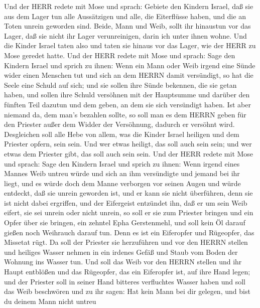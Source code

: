  Und der HERR redete mit Mose und sprach: 
Gebiete den Kindern Israel, daß sie aus dem Lager tun alle Aussätzigen
und alle, die Eiterflüsse haben, und die an Toten unrein geworden sind.
 Beide, Mann und Weib, sollt ihr hinaustun vor das Lager,
daß sie nicht ihr Lager verunreinigen, darin ich unter ihnen wohne.
 Und die Kinder Israel taten also und taten sie hinaus vor
das Lager, wie der HERR zu Mose geredet hatte.  Und der HERR
redete mit Mose und sprach:  Sage den Kindern Israel und
sprich zu ihnen: Wenn ein Mann oder Weib irgend eine Sünde wider einen
Menschen tut und sich an dem HERRN damit versündigt, so hat die Seele
eine Schuld auf sich;  und sie sollen ihre Sünde bekennen,
die sie getan haben, und sollen ihre Schuld versöhnen mit der Hauptsumme
und darüber den fünften Teil dazutun und dem geben, an dem sie sich
versündigt haben.  Ist aber niemand da, dem man's bezahlen
sollte, so soll man es dem HERRN geben für den Priester außer dem Widder
der Versöhnung, dadurch er versöhnt wird.  Desgleichen soll
alle Hebe von allem, was die Kinder Israel heiligen und dem Priester
opfern, sein sein.  Und wer etwas heiligt, das soll auch
sein sein; und wer etwas dem Priester gibt, das soll auch sein sein.
 Und der HERR redete mit Mose und sprach: 
Sage den Kindern Israel und sprich zu ihnen: Wenn irgend eines Mannes
Weib untreu würde und sich an ihm versündigte  und jemand
bei ihr liegt, und es würde doch dem Manne verborgen vor seinen Augen
und würde entdeckt, daß sie unrein geworden ist, und er kann sie nicht
überführen, denn sie ist nicht dabei ergriffen,  und der
Eifergeist entzündet ihn, daß er um sein Weib eifert, sie sei unrein
oder nicht unrein,  so soll er sie zum Priester bringen und
ein Opfer über sie bringen, ein zehntel Epha Gerstenmehl, und soll kein
Öl darauf gießen noch Weihrauch darauf tun. Denn es ist ein Eiferopfer
und Rügeopfer, das Missetat rügt.  Da soll der Priester sie
herzuführen und vor den HERRN stellen  und heiliges Wasser
nehmen in ein irdenes Gefäß und Staub vom Boden der Wohnung ins Wasser
tun.  Und soll das Weib vor den HERRN stellen und ihr Haupt
entblößen und das Rügeopfer, das ein Eiferopfer ist, auf ihre Hand
legen; und der Priester soll in seiner Hand bitteres verfluchtes Wasser
haben  und soll das Weib beschwören und zu ihr sagen: Hat
kein Mann bei dir gelegen, und bist du deinem Mann nicht untreu
